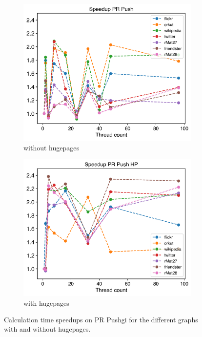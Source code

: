 







\begin{figure}
	\hfil
	\begin{subfigure}{0.32\textwidth}
		\includegraphics[width=\linewidth]{../../plots/singleNodePRPushGaloisThreads.png}
		\caption{without hugepages}
		\label{fig:galoisSpeedupPRPush_noHP}
	\end{subfigure}
	\hfil
	\begin{subfigure}{0.32\textwidth}
		\includegraphics[width=\linewidth]{../../plots/singleNodePRPushGaloisHPThreads.png}
		\caption{with hugepages}
		\label{fig:galoisSpeedupPRPush_HP}
	\end{subfigure}
	\hfil
	\caption{Calculation time speedups on PR Pushgi for the different graphs with and without hugepages.}
	\label{fig:galoisSpeedupPRPush}
\end{figure}
